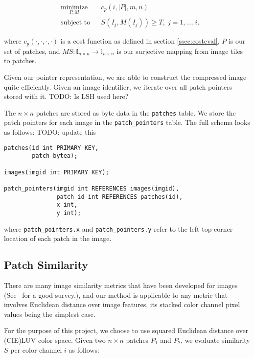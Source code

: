 \begin{equation*}
\begin{aligned}
& \underset{P, M}{\text{minimize}}
& & c_p(i, |P|, m, n) \\
& \text{subject to}
& & S(I_j, M(I_j)) \geq T, \; j = 1, \ldots, i.
\end{aligned}
\end{equation*}

where $c_p(\cdot, \cdot, \cdot, \cdot)$ is a cost function as defined in section \ref{ssec:costeval}, $P$ is our set of patches, and $M S \colon \mathds{I}_{n \times n}  \to \mathds{I}_{n \times n}$ is our surjective mapping from image tiles to patches.

Given our pointer representation, we are able to construct the compressed image quite efficiently.  Given an image identifier, we iterate over all patch pointers stored with it.  TODO: Is LSH used here?


The $n \times n$ patches are stored as byte data in the \texttt{patches} table.
We store the patch pointers for
each image in the \texttt{patch\_pointers} table. The full schema looks as follows: TODO: update this
\begin{verbatim}
patches(id int PRIMARY KEY,
        patch bytea);

images(imgid int PRIMARY KEY);

patch_pointers(imgid int REFERENCES images(imgid),
               patch_id int REFERENCES patches(id),
               x int,
               y int);
\end{verbatim}
where \texttt{patch\_pointers.x} and \texttt{patch\_pointers.y}
refer to the left top corner location of each patch in the image.




\subsection{Patch Similarity}\label{ssec:sim}
There are many image similarity metrics that have been developed for
images (See~\cite{yasmin2013use} for a good survey.), and
our method is applicable to any metric that involves Euclidean
distance over image features, its stacked color channel pixel values
being the simplest case.

For the purpose of this project, we choose to use squared Euclidean
distance over (CIE)LUV color space.
Given two $n \times n$ patches $P_1$ and $P_2$, we evaluate similarity $S$
per color channel $i$ as follows:

